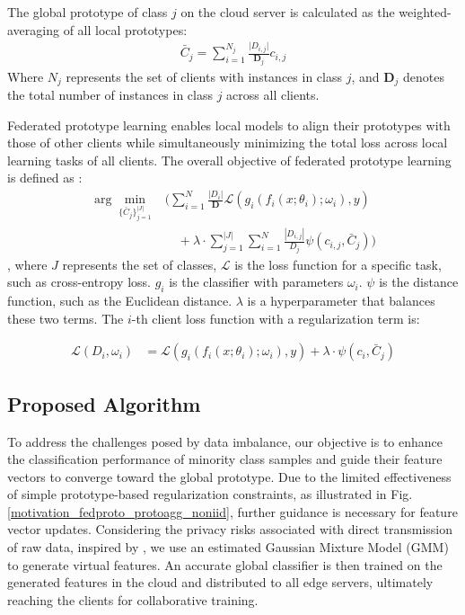 \documentclass[journal]{IEEEtran}
\begin{document}
The global prototype of class $j$ on the cloud server is calculated as the weighted-averaging of all local prototypes:
\begin{align}
\label{cloud prototype formula}
\bar{C}_j = \sum_{i=1}^{N_j}{ \frac{\rvert D_{i,j}\rvert}{\mathbf{D}_j} c_{i,j}}
\end{align} 
Where $N_j$ represents the set of clients with instances in class \(j\), and $\mathbf{D}_j$ denotes the total number of instances in class \(j\) across all clients.

Federated prototype learning enables local models to align their prototypes with those of other clients while simultaneously minimizing the total loss across local learning tasks of all clients. The overall objective of federated prototype learning is defined as \cite{tan_fedproto_2021}:
\begin{align}
\label{overall objective formula}
\arg\min_{\{\bar{C}_j\}^{|J|}_{j=1}}  &\bigg(\sum_{i=1}^N \frac{|D_i|}{\mathbf{D}} \mathcal{L}(g_i(f_i(x;\theta_i); \omega_i), y) \\
&\quad + \lambda \cdot \sum_{j=1}^{|J|} \sum_{i=1}^N \frac{|D_{i,j}|}{D_j} \psi(c_{i,j}, \bar{C}_j) \bigg)
\end{align},
where $J$ represents the set of classes, $\mathcal{L}$ is the loss function for a specific task, such as cross-entropy loss. $g_i$ is the classifier with parameters $\omega_i$. $\psi$ is the distance function, such as the Euclidean distance.  $\lambda$ is a hyperparameter that balances these two terms. The $i$-th client loss function with a regularization term \cite{tan_fedproto_2021} is:

\begin{align}
  \label{original loss function}
  \mathcal{L}(D_i,\omega_i) &=  \mathcal{L}(g_i(f_i(x;\theta_i); \omega_i), y) + \lambda \cdot \psi(c_{i}, \bar{C}_j)
\end{align}


\subsection{Proposed Algorithm}
To address the challenges posed by data imbalance, our objective is to enhance the classification performance of minority class samples and guide their feature vectors to converge toward the global prototype. Due to the limited effectiveness of simple prototype-based regularization constraints, as illustrated in Fig. \ref{motivation_fedproto_protoagg_noniid}, further guidance is necessary for feature vector updates. Considering the privacy risks associated with direct transmission of raw data, inspired by \cite{luo_no_2021}, we use an estimated Gaussian Mixture Model (GMM) to generate virtual features. An accurate global classifier is then trained on the generated features in the cloud and distributed to all edge servers, ultimately reaching the clients for collaborative training.
\end{document}
